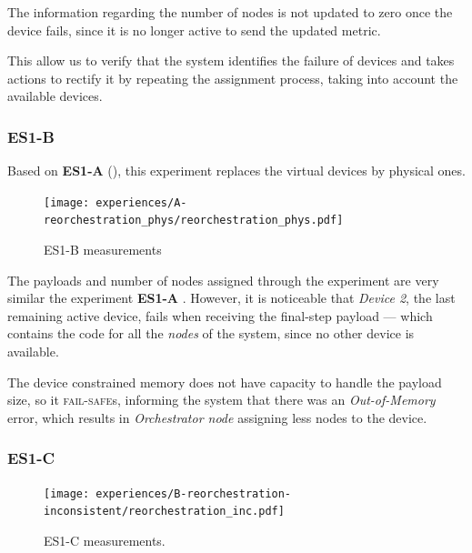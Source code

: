 The information regarding the number of nodes is not updated to zero once the device fails, since it is no longer active to send the updated metric. 

This allow us to verify that the system identifies the failure of devices and takes actions to rectify it by repeating the assignment process, taking into account the available devices.


\subsubsection{ES1-B}

Based on \textbf{ES1-A} (\cf {}), this experiment replaces the virtual devices by physical ones. 

\begin{figure}[h]
    \centering
    \texttt{[image: experiences/A-reorchestration\_phys/reorchestration\_phys.pdf]}
    \caption{ES1-B measurements}
    \label{fig:experiment_a_phys_graph}
\end{figure}

The payloads and number of nodes assigned through the experiment are very similar the experiment \textbf{ES1-A} . However, it is noticeable that \textit{Device 2}, the last remaining active device, fails when receiving the final-step payload --- which contains the code for all the \textit{nodes} of the system, since no other device is available. 

The device constrained memory does not have capacity to handle the payload size, so it \textsc{fail-safe}s, informing the system that there was an \textit{Out-of-Memory} error, which results in \textit{Orchestrator node} assigning less nodes to the device.


\subsubsection{ES1-C}

\begin{figure}[h]
    \centering
    \texttt{[image: experiences/B-reorchestration-inconsistent/reorchestration\_inc.pdf]}
    \caption[ES1-C measurements]{ES1-C measurements.}
    \label{fig:experiment_b_graph}
\end{figure}

